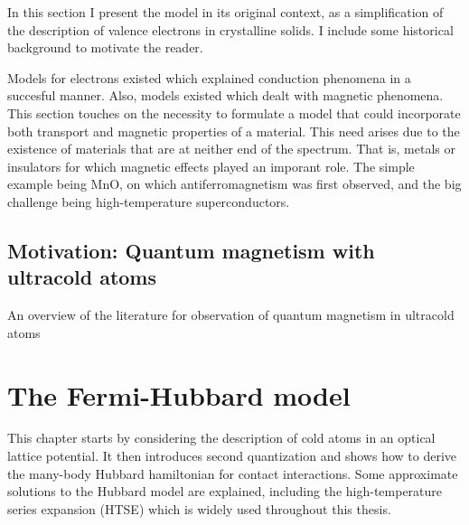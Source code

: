 \documentclass[oneside,11pt]{memoir}
\begin{document}

In this section I present the model in its original context, as a
simplification of the description of valence electrons in crystalline solids.
I include some historical background to motivate the reader.  

Models for electrons existed which explained conduction phenomena in a
succesful manner.  Also, models existed which dealt with magnetic phenomena.
This section touches on the necessity to formulate a model that could
incorporate both transport and magnetic properties of a material.   This need
arises due to the existence of materials that are at neither end of the
spectrum.  That is, metals or insulators for which magnetic effects played an
imporant role.   The simple example being MnO, on which antiferromagnetism was
first observed,  and the big challenge being high-temperature
superconductors. 

\section{ Motivation:  Quantum magnetism with ultracold atoms }

An overview of the literature for observation of quantum magnetism in ultracold
atoms






\chapter{The Fermi-Hubbard model}


This chapter starts by considering the description of cold atoms in an optical
lattice potential.  It then introduces second quantization and shows how to
derive the many-body Hubbard hamiltonian for contact interactions.  Some
approximate solutions to the Hubbard model are explained,  including the
high-temperature series expansion (HTSE) which is widely used throughout this
thesis.   
\end{document}
